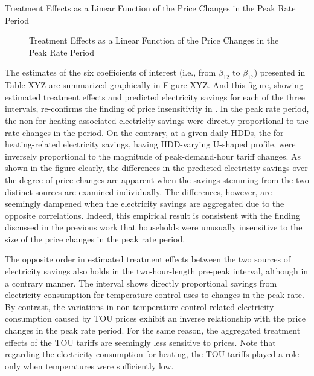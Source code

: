 \begin{table}
    \caption{Treatment Effects as a Linear Function of the Price Changes in the Peak Rate Period}
\end{table}

\begin{figure}[!th]
\centering
\caption{Treatment Effects as a Linear Function of the Price Changes in the Peak Rate Period}
\label{Figure:Treatment-Effects-as-a-Linear-Function-of-the-Price-Changes-in-the-Peak-Rate-Period}
\end{figure}

The estimates of the six coefficients of interest (i.e., from $\beta_{12}$ to $\beta_{17}$) presented in Table XYZ are summarized graphically in Figure XYZ. And this figure, showing estimated treatment effects and predicted electricity savings for each of the three intervals, re-confirms the finding of price insensitivity in \cite{Peaking-Interest:How-Awareness-Drives-the-Effectiveness-of-Time-of-Use-Electricity-Pricing_Prest_2020}. In the peak rate period, the non-for-heating-associated electricity savings were directly proportional to the rate changes in the period. On the contrary, at a given daily HDDs, the for-heating-related electricity savings, having HDD-varying U-shaped profile, were inversely proportional to the magnitude of peak-demand-hour tariff changes. As shown in the figure clearly, the differences in the predicted electricity savings over the degree of price changes are apparent when the savings stemming from the two distinct sources are examined individually. The differences, however, are seemingly dampened when the electricity savings are aggregated due to the opposite correlations. Indeed, this empirical result is consistent with the finding discussed in the previous work that households were unusually insensitive to the size of the price changes in the peak rate period. 

The opposite order in estimated treatment effects between the two sources of electricity savings also holds in the two-hour-length pre-peak interval, although in a contrary manner. The interval shows directly proportional savings from electricity consumption for temperature-control uses to changes in the peak rate. By contrast, the variations in non-temperature-control-related electricity consumption caused by TOU prices exhibit an inverse relationship with the price changes in the peak rate period. For the same reason, the aggregated treatment effects of the TOU tariffs are seemingly less sensitive to prices. Note that regarding the electricity consumption for heating, the TOU tariffs played a role only when temperatures were sufficiently low. 

